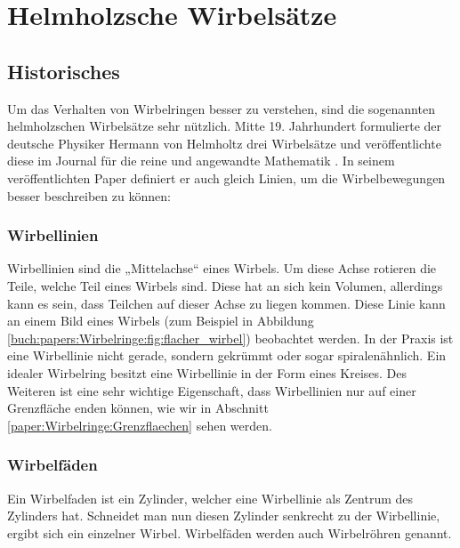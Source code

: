 %
%
%
\section{Helmholzsche Wirbelsätze}

\subsection{Historisches}

Um das Verhalten von Wirbelringen besser zu verstehen, sind die sogenannten helmholzschen Wirbelsätze sehr nützlich. 
Mitte 19. Jahrhundert formulierte der deutsche Physiker Hermann von Helmholtz drei Wirbelsätze und veröffentlichte diese im Journal für die reine und angewandte Mathematik \cite{Wirbelringe:JournalHelmholz}.
In seinem veröffentlichten Paper definiert er auch gleich Linien, um die Wirbelbewegungen besser beschreiben zu können:

\subsubsection*{Wirbellinien}
\label{paper:Wirbelringe:Wirbellinien}

Wirbellinien sind die „Mittelachse“ eines Wirbels. 
Um diese Achse rotieren die Teile, welche Teil eines Wirbels sind. 
Diese hat an sich kein Volumen, allerdings kann es sein, dass Teilchen auf dieser Achse zu liegen kommen. 
Diese Linie kann an einem Bild eines Wirbels (zum Beispiel in Abbildung \ref{buch:papers:Wirbelringe:fig:flacher_wirbel}) beobachtet werden. 
In der Praxis ist eine Wirbellinie nicht gerade, sondern gekrümmt oder sogar spiralenähnlich. 
Ein idealer Wirbelring besitzt eine Wirbellinie in der Form eines Kreises.
Des Weiteren ist eine sehr wichtige Eigenschaft, dass Wirbellinien nur auf einer Grenzfläche enden können, 
wie wir in Abschnitt \ref{paper:Wirbelringe:Grenzflaechen} sehen werden.

\subsubsection*{Wirbelfäden}
\label{paper:Wirbelringe:Wirbelfaden}

Ein Wirbelfaden ist ein Zylinder, welcher eine Wirbellinie als Zentrum des Zylinders hat. 
Schneidet man nun diesen Zylinder senkrecht zu der Wirbellinie, ergibt sich ein einzelner Wirbel. 
Wirbelfäden werden auch Wirbelröhren genannt.

